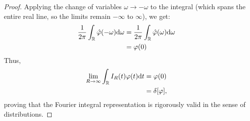 \begin{proof}
Applying the change of variables $\omega \to -\omega$ to the integral (which spans the entire real line, so the limits remain $-\infty$ to $\infty$), we get:
\begin{equation}
\begin{aligned}
\frac{1}{2\pi} \int_{\mathbb{R}} \hat{\varphi}(-\omega) \mathrm{d} \omega &= \frac{1}{2\pi} \int_{\mathbb{R}} \hat{\varphi}(\omega) \mathrm{d} \omega \\
&= \varphi(0)
\end{aligned}
\end{equation}
Thus,
\[
\begin{aligned}
\lim_{R \to \infty} \int_{\mathbb{R}} I_R(t) \varphi(t) \mathrm{d} t &= \varphi(0) \\
&= \delta[\varphi],
\end{aligned}
\]
proving that the Fourier integral representation is rigorously valid in the sense of distributions.
\end{proof}
